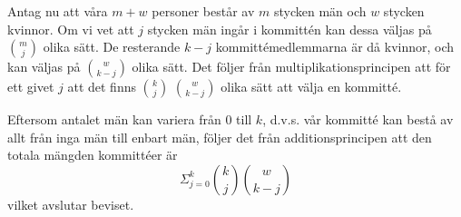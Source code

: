 \documentclass{article}
\begin{document}
Antag nu att våra $m + w$ personer består av $m$ stycken män och $w$ stycken kvinnor. Om vi vet att $j$ stycken män ingår i kommittén kan dessa väljas på $m \choose j$ olika sätt. De resterande $k - j$ kommittémedlemmarna är då kvinnor, och kan väljas på $w \choose k - j$ olika sätt. Det följer från multiplikationsprincipen att för ett givet $j$ att det finns $k \choose j$ $w \choose k - j$ olika sätt att välja en kommitté. 

Eftersom antalet män kan variera från $0$ till $k$, d.v.s. vår kommitté kan bestå av allt från inga män till enbart män, följer det från additionsprincipen att den totala mängden kommittéer är $$
\Sigma _{j=0} ^{k} {k \choose j} {w \choose k - j}
$$
vilket avslutar beviset. 
\end{document}
